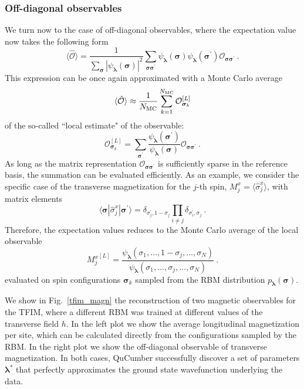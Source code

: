 \documentclass[submission, Phys]{SciPost}
\begin{document}
\subsubsection{Off-diagonal observables}
We turn now to the case of off-diagonal observables, where the expectation value now takes the following form
\begin{equation}
\langle \hat{\mathcal{O}} \rangle = \frac{1}{\sum_{\bm{\sigma}} |\psi_{\bm{\lambda}}(\bm{\sigma})|^2}
\sum_{\bm{\sigma\sigma}^\prime} \psi_{\bm{\lambda}}(\bm{\sigma})
\psi_{\bm{\lambda}}(\bm{\sigma}^\prime)\mathcal{O}_{\bm{\sigma\sigma}^\prime}\:.
\end{equation}
This expression can be once again approximated with a Monte Carlo average 
\begin{equation}
\langle \hat{\mathcal{O}}\rangle \approx \frac{1}{N_{\rm MC}} \sum_{k=1}^{N_{\rm MC}}  \mathcal{O}^{[L]}_{\bm{\sigma}_k}
\end{equation}
of the so-called ``local estimate" of the observable: 
\begin{equation}
\mathcal{O}^{[L]}_{\bm{\sigma}_k}=\sum_{\bm{\sigma}^\prime}\frac{\psi_{\bm{\lambda}}(\bm{\sigma}^\prime)}{\psi_{\bm{\lambda}}(\bm{\sigma})} \mathcal{O}_{\bm{\sigma\sigma}^\prime}\:.
\end{equation}
As long as the matrix representation $\mathcal{O}_{\bm{\sigma\sigma}^\prime}$ is sufficiently sparse in the reference basis, the summation can be evaluated efficiently. As an example, we consider the specific case of the transverse magnetization for the $j$-th spin, $M_j^x=\langle\hat{\sigma}^x_j\rangle$, with matrix elements
\begin{equation}
\langle\bm{\sigma}|\hat{\sigma}^x_j|\bm{\sigma}^{\prime}\rangle=\delta_{\sigma_j^\prime,1-\sigma_j}\prod_{i\ne j}\delta_{\sigma_i^\prime,\sigma_j}\:.
\end{equation}
Therefore, the expectation values reduces to the Monte Carlo average of the local observable
\begin{equation}
{M_j^x}^{[L]}=\frac{\psi_{\bm{\lambda}}(\sigma_1,\dots,1-\sigma_j,\dots,\sigma_N)}
{\psi_{\bm{\lambda}}(\sigma_1,\dots,\sigma_j,\dots,\sigma_N)} 
\:.
\end{equation}
evaluated on spin configurations $\bm{\sigma}_k$ sampled from the RBM distribution $p_{\bm{\lambda}}(\bm{\sigma})$. 

We show in Fig.~\ref{tfim_magn} the reconstruction of two magnetic observables for the TFIM, where a different RBM was trained at different values of the transverse field $h$. In the left plot we show the average longitudinal magnetization per site, which can be calculated directly from the configurations sampled by the RBM. In the right plot we show the off-diagonal observable of transverse magnetization. In both cases, QuCumber successfully discover a set of parameters $\bm{\lambda}^*$ that perfectly approximates the ground state wavefunction underlying the data.
\end{document}
